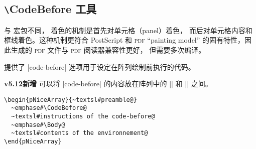 \documentclass[dvipsnames]{article}%
\begin{document}
\subsection{\texttt{\textbackslash}CodeBefore 工具}

与 宏包不同， 着色的机制是首先对单元格（panel）着色，
而后对单元格内容和框线着色。这种机制更符合 PostScript 和 \textsc{pdf} ``painting model'' 的固有特性，因此生成的 \textsc{pdf} 文件与 \textsc{pdf} 阅读器兼容性更好，
但需要多次编译。


\medskip
{} 提供了 |code-before| 选项用于设定在阵列绘制前执行的代码。


\colorbox{yellow!50}{\textbf{v5.12新增}}\enskip 
可以将 |code-before| 的内容放在阵列中的 |\CodeBefore| 和 |\Body| 之间。

\bigskip
\begin{Verbatim}
\begin{pNiceArray}{~textsl#preamble@}
  ~emphase#\CodeBefore@
  ~textsl#instructions of the code-before@
  ~emphase#\Body@
  ~textsl#contents of the environnement@
\end{pNiceArray}
\end{Verbatim}
%

\end{document}
